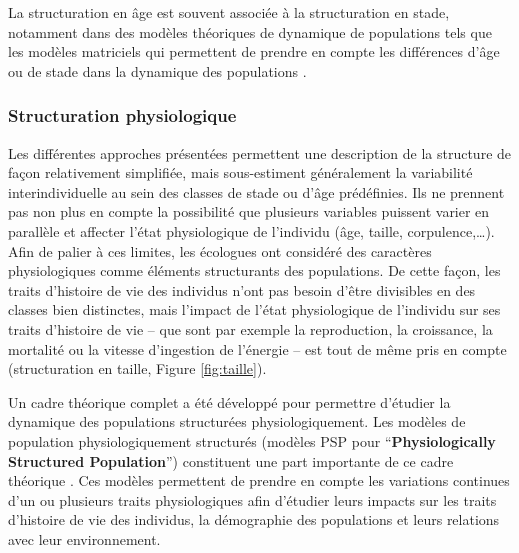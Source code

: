 La structuration en âge est souvent associée à la structuration en stade,
notamment dans des modèles théoriques de dynamique de populations tels que les
modèles matriciels qui permettent de prendre en compte les différences d'âge ou
de stade dans la dynamique des populations
\autocites{caswell2001a,sarrazin2000demographic}. 

\subsubsection{Structuration physiologique}

Les différentes approches présentées permettent une description de la structure
de façon relativement simplifiée, mais sous-estiment généralement la variabilité
interindividuelle au sein des classes de stade ou d'âge prédéfinies. Ils ne
prennent pas non plus en compte la possibilité que plusieurs variables puissent
varier en parallèle et affecter l'état physiologique de l'individu (âge, taille,
corpulence,\ldots). Afin de palier à ces limites, les écologues ont considéré
des caractères physiologiques comme éléments structurants des populations. De cette façon, les traits
d'histoire de vie des individus n'ont pas besoin d'être divisibles en des
classes bien distinctes, mais l'impact de l'état physiologique de l'individu sur
ses traits d'histoire de vie -- que sont par exemple la reproduction, la
croissance, la mortalité ou la vitesse d'ingestion de l'énergie -- est tout de
même pris en compte 
(structuration en taille, Figure \ref{fig:taille}).

Un cadre théorique complet a été développé pour permettre d'étudier la dynamique
des populations structurées physiologiquement. Les modèles de
population physiologiquement structurés (modèles PSP pour
``\textbf{Physiologically Structured Population}'') constituent une part
importante de ce cadre théorique \autocites{metz1986a,de-roos1992a,de-roos1997a}. Ces modèles permettent de
prendre en compte les variations continues d'un ou plusieurs traits
physiologiques afin d'étudier leurs impacts sur les traits d'histoire de vie
des individus, la démographie des populations et leurs relations avec leur
environnement.

